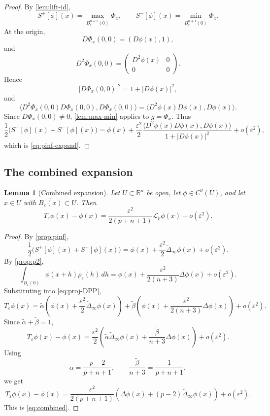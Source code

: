\documentclass[12pt,reqno]{amsart}
\numberwithin{equation}{section}
\theoremstyle{plain}
\newtheorem{lemma}[lemma]{Lemma}
\theoremstyle{definition}
\theoremstyle{remark}
\newcommand{\R}{\mathbb{R}}
\newcommand{\talpha}{\widetilde\alpha}
\newcommand{\tbeta}{\widetilde\beta}
\newcommand{\Sp}{S^+}
\newcommand{\Sm}{S^-}
\newcommand{\rhoeps}{\rho_\varepsilon}
\newcommand{\DeltaiR}{\widetilde\Delta_\infty}
\newcommand{\Lp}{\mathcal L_p}
\begin{document}
\begin{proof}
By \cref{lem:lift-id},
\[
  \Sp[\phi](x)
  =
  \max_{\overline{B_\varepsilon^{n+1}(0)}}\Phi_x,
  \qquad
  \Sm[\phi](x)
  =
  \min_{\overline{B_\varepsilon^{n+1}(0)}}\Phi_x.
\]
At the origin,
\[
  D\Phi_x(0,0)=(D\phi(x),1),
\]
and
\[
  D^2\Phi_x(0,0)
  =
  \begin{pmatrix}
    D^2\phi(x) & 0\\
    0 & 0
  \end{pmatrix}.
\]
Hence
\[
  |D\Phi_x(0,0)|^2
  =
  1+|D\phi(x)|^2,
\]
and
\[
  \langle
    D^2\Phi_x(0,0)D\Phi_x(0,0),
    D\Phi_x(0,0)
  \rangle
  =
  \langle
    D^2\phi(x)D\phi(x),
    D\phi(x)
  \rangle.
\]
Since $D\Phi_x(0,0)\ne0$, \cref{lem:max-min} applies to $g=\Phi_x$.
Thus
\[
  \frac12
  \bigl(\Sp[\phi](x)+\Sm[\phi](x)\bigr)
  =
  \phi(x)
  +
  \frac{\varepsilon^2}{2}
  \frac{
    \langle D^2\phi(x)D\phi(x),D\phi(x)\rangle
  }{
    1+|D\phi(x)|^2
  }
  +
  o(\varepsilon^2),
\]
which is \eqref{eq:pinf-expand}.
\end{proof}

\subsection{The combined expansion}
\label{subsec:general}

\begin{lemma}[Combined expansion]
\label{lem:combined}
Let $U\subset\R^n$ be open, let $\phi\in C^2(U)$, and let
$x\in U$ with $\overline{B_\varepsilon(x)}\subset U$. Then
\begin{equation}\label{eq:combined}
  T_\varepsilon\phi(x)-\phi(x)
  =
  \frac{\varepsilon^2}{2(p+n+1)}
  \Lp\phi(x)
  +
  o(\varepsilon^2).
\end{equation}
\end{lemma}

\begin{proof}
By \cref{prop:pinf},
\[
  \frac12
  \bigl(\Sp[\phi](x)+\Sm[\phi](x)\bigr)
  =
  \phi(x)
  +
  \frac{\varepsilon^2}{2}
  \DeltaiR\phi(x)
  +
  o(\varepsilon^2).
\]
By \cref{prop:p2},
\[
  \int_{B_\varepsilon(0)}
  \phi(x+h)\rhoeps(h)\,dh
  =
  \phi(x)
  +
  \frac{\varepsilon^2}{2(n+3)}
  \Delta\phi(x)
  +
  o(\varepsilon^2).
\]
Substituting into \eqref{eq:proj-DPP},
\[
  T_\varepsilon\phi(x)
  =
  \talpha
  \left(
    \phi(x)
    +
    \frac{\varepsilon^2}{2}
    \DeltaiR\phi(x)
  \right)
  +
  \tbeta
  \left(
    \phi(x)
    +
    \frac{\varepsilon^2}{2(n+3)}
    \Delta\phi(x)
  \right)
  +
  o(\varepsilon^2).
\]
Since $\talpha+\tbeta=1$,
\[
  T_\varepsilon\phi(x)-\phi(x)
  =
  \frac{\varepsilon^2}{2}
  \left(
    \talpha\DeltaiR\phi(x)
    +
    \frac{\tbeta}{n+3}\Delta\phi(x)
  \right)
  +
  o(\varepsilon^2).
\]
Using
\[
  \talpha=\frac{p-2}{p+n+1},
  \qquad
  \frac{\tbeta}{n+3}
  =
  \frac{1}{p+n+1},
\]
we get
\[
  T_\varepsilon\phi(x)-\phi(x)
  =
  \frac{\varepsilon^2}{2(p+n+1)}
  \left(
    \Delta\phi(x)
    +
    (p-2)\DeltaiR\phi(x)
  \right)
  +
  o(\varepsilon^2).
\]
This is \eqref{eq:combined}.
\end{proof}
\end{document}
